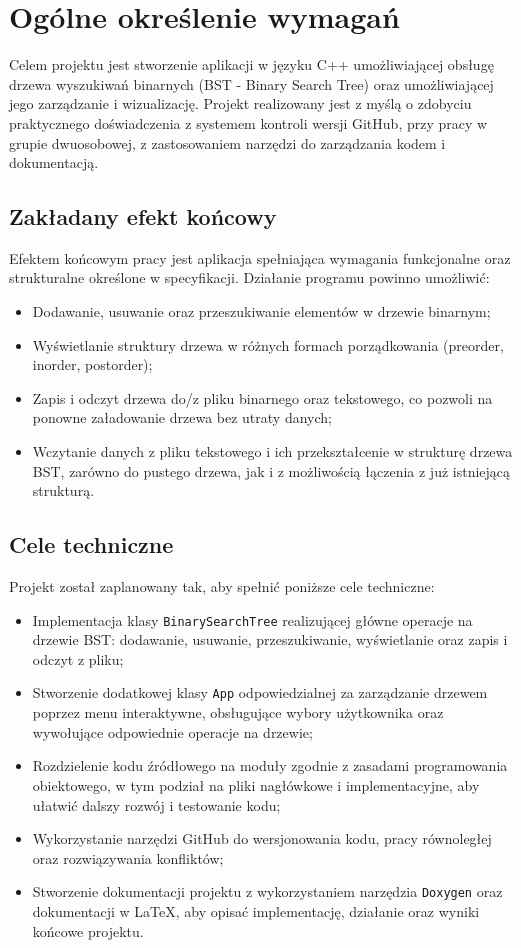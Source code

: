 \newpage
\section{Ogólne określenie wymagań}

Celem projektu jest stworzenie aplikacji w języku C++ umożliwiającej obsługę drzewa wyszukiwań binarnych (BST - Binary Search Tree) oraz umożliwiającej jego zarządzanie i wizualizację. Projekt realizowany jest z myślą o zdobyciu praktycznego doświadczenia z systemem kontroli wersji GitHub, przy pracy w grupie dwuosobowej, z zastosowaniem narzędzi do zarządzania kodem i dokumentacją.

\subsection{Zakładany efekt końcowy}

Efektem końcowym pracy jest aplikacja spełniająca wymagania funkcjonalne oraz strukturalne określone w specyfikacji. Działanie programu powinno umożliwić:
\begin{itemize}
  \item Dodawanie, usuwanie oraz przeszukiwanie elementów w drzewie binarnym;
  \item Wyświetlanie struktury drzewa w różnych formach porządkowania (preorder, inorder, postorder);
  \item Zapis i odczyt drzewa do/z pliku binarnego oraz tekstowego, co pozwoli na ponowne załadowanie drzewa bez utraty danych;
  \item Wczytanie danych z pliku tekstowego i ich przekształcenie w strukturę drzewa BST, zarówno do pustego drzewa, jak i z możliwością łączenia z już istniejącą strukturą.
\end{itemize}

\subsection{Cele techniczne}

Projekt został zaplanowany tak, aby spełnić poniższe cele techniczne:
\begin{itemize}
  \item Implementacja klasy \texttt{BinarySearchTree} realizującej główne operacje na drzewie BST: dodawanie, usuwanie, przeszukiwanie, wyświetlanie oraz zapis i odczyt z pliku;
  \item Stworzenie dodatkowej klasy \texttt{App} odpowiedzialnej za zarządzanie drzewem poprzez menu interaktywne, obsługujące wybory użytkownika oraz wywołujące odpowiednie operacje na drzewie;
  \item Rozdzielenie kodu źródłowego na moduły zgodnie z zasadami programowania obiektowego, w tym podział na pliki nagłówkowe i implementacyjne, aby ułatwić dalszy rozwój i testowanie kodu;
  \item Wykorzystanie narzędzi GitHub do wersjonowania kodu, pracy równoległej oraz rozwiązywania konfliktów;
  \item Stworzenie dokumentacji projektu z wykorzystaniem narzędzia \texttt{Doxygen} oraz dokumentacji w \LaTeX, aby opisać implementację, działanie oraz wyniki końcowe projektu.
\end{itemize}

